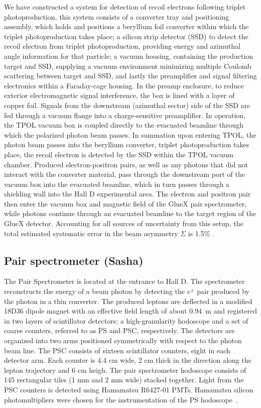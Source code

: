 We have constructed a system for detection of recoil electrons following triplet photoproduction, this system consists of a converter tray and positioning assembly,
which holds and positions a beryllium foil converter within which the triplet
photoproduction takes place; a silicon strip detector (SSD) to detect the recoil
electron from triplet photoproduction, providing energy and azimuthal
angle information for that particle; a vacuum housing, containing the production target and SSD, supplying a vacuum environment minimizing multiple Coulomb scattering
between target and SSD, and lastly the preamplifier and signal filtering electronics
within a Faraday-cage housing.
In the preamp enclosure, to reduce exterior electromagnetic signal interference,
the box is lined with a layer of copper foil. Signals from the downstream (azimuthal sector)
side of the SSD are fed through a vacuum flange into a charge-sensitive preamplifier.
In operation, the TPOL vacuum box is coupled directly to the evacuated
beamline through which the polarized photon beam passes. In summation upon entering
TPOL, the photon beam passes into the beryllium converter, triplet photoproduction takes
place, the recoil electron is detected by the SSD within the TPOL vacuum chamber.
Produced electron-positron pairs, as well as any photons that did not interact with the converter material, pass through the downstream port of the vacuum box into the evacuated
beamline, which in turn passes through a shielding wall into the Hall D experimental area. The electron and positron pair then enter the vacuum box and magnetic field of the GlueX pair
spectrometer, while photons continue through an evacuated beamline to the target region of
the GlueX detector.
Accounting for all sources of uncertainty from this setup, the total estimated systematic
error in the beam asymmetry $\Sigma$ is 1.5\% \cite{DUGGER2017115}.

\subsection{Pair spectrometer         (Sasha) \label{sec:ps}}

The Pair Spectrometer \cite{BARBOSA2015376} is located at the entrance to Hall D.
The spectrometer reconstructs the energy of a beam photon by detecting the $e^\pm$ pair produced by the photon in a thin converter. 
The produced leptons are deflected in a modified 18D36 dipole magnet with an effective field length of about 0.94~m and registered in two layers of scintillator
detectors: a high-granularity hodoscope and a set of coarse counters,
referred to as PS and PSC, respectively. The detectors are organized into two arms positioned symmetrically with respect to the photon beam line. The PSC consists of sixteen scintillator counters, eight in each detector arm. Each counter is 4.4 cm wide, 2 cm thick in the direction along the lepton trajectory and 6 cm heigh. The pair spectrometer hodoscope consists of 145 rectangular 
tiles (1 mm and 2 mm wide) stacked together. Light from the PSC counters is detected using Hamamatsu R6427-01 PMTs. Hamamatsu silicon photomultipliers were chosen for the instrumentation of the PS hodoscope~\cite{Barbosa:2017zzw,Somov:2017kif,Tolstukhin:2014zsa}.

